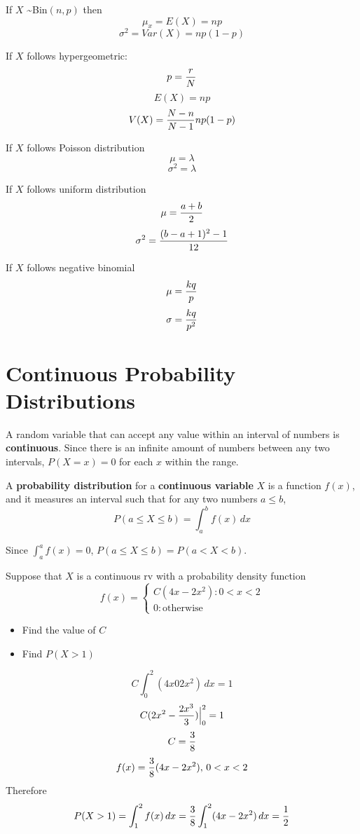 \documentclass[english, 12pt]{article}
\begin{document}
If $X$ \textasciitilde Bin$(n,p)$ then
\[\mu_{x} = E(X) = np\]
\[\sigma^2 = Var(X) = np(1-p)\]

If $X$ follows hypergeometric:
\[p = \frac{r}{N}\]
\[E(X) = np\]
\[V(X) = \frac{N-n}{N-1} np(1-p)\]

If $X$ follows Poisson distribution
\[\mu = \lambda\]
\[\sigma^2 = \lambda\]


If $X$ follows uniform distribution
\[\mu = \frac{a+b}{2}\]
\[\sigma^2 = \frac{(b-a+1)^2 - 1}{12}\]

If $X$ follows negative binomial
\[\mu = \frac{kq}{p}\]
\[\sigma = \frac{kq}{p^2}\]


\section{Continuous Probability Distributions}

\begin{defn}
A random variable that can accept any value within an interval of numbers is \textbf{continuous}. Since there is an infinite amount of numbers between any two intervals, $P(X=x) = 0$ for each $x$ within the range.
\end{defn}

\begin{defn}
A \textbf{probability distribution} for a \textbf{continuous variable} $X$ is a function $f(x)$, and it measures an interval such that for any two numbers $a \leq b$,
\[P(a \leq X \leq b) = \int_a^b f(x)\,dx\]
\end{defn}

\begin{note}
Since $\int_a^a f(x) = 0$, $P(a \leq X \leq b) = P(a < X < b)$.
\end{note}

\begin{exmp}
Suppose that $X$ is a continuous rv with a probability density function
\begin{displaymath}
   f(x) = \left\{
     \begin{array}{lr}
       C(4x-2x^2) : 0 < x < 2 \\
       0 : \text{otherwise}
     \end{array}
   \right.
\end{displaymath}
\begin{itemize}
\item Find the value of $C$
\item Find $P(X > 1)$
\end{itemize}

\begin{sol}
\[C \int_0^2 (4x 02x^2)\,dx = 1\]
\[C (2x^2 - \frac{2x^3}{3})\Big|_0^2 = 1\]
\[C = \frac{3}{8}\]
\[f(x)=\frac{3}{8}(4x-2x^2),\,0<x<2\]
Therefore
\[P (X > 1) = \int_1^2 f(x)\,dx = \frac{3}{8} \int_1^2 (4x - 2x^2)\,dx = \frac{1}{2}\]
\end{sol}
\end{exmp}
\end{document}
